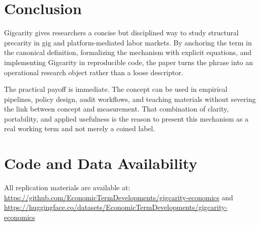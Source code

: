 \documentclass[12pt]{article}
\begin{document}
\section{Conclusion}
Gigcarity gives researchers a concise but disciplined way to study structural precarity in gig and platform-mediated labor markets. By anchoring the term in the canonical definition, formalizing the mechanism with explicit equations, and implementing Gigcarity in reproducible code, the paper turns the phrase into an operational research object rather than a loose descriptor.

The practical payoff is immediate. The concept can be used in empirical pipelines, policy design, audit workflows, and teaching materials without severing the link between concept and measurement. That combination of clarity, portability, and applied usefulness is the reason to present this mechanism as a real working term and not merely a coined label.

\section*{Code and Data Availability}
All replication materials are available at:
\url{https://github.com/EconomicTermDevelopments/gigcarity-economics} and
\url{https://huggingface.co/datasets/EconomicTermDevelopments/gigcarity-economics}
\end{document}
